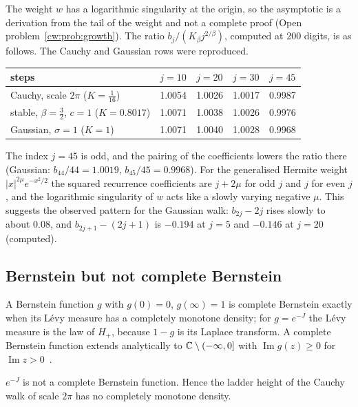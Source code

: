 The weight $w$ has a logarithmic singularity at the origin, so the asymptotic is a derivation from the tail of the weight and not a complete proof (Open problem~\ref{cw:prob:growth}). The ratio $b_j/(K_\beta j^{2/\beta})$, computed at 200 digits, is as follows. The Cauchy and Gaussian rows were reproduced.
\begin{center}
\small
\begin{tabular}{lllll}
\toprule
steps & $j=10$ & $j=20$ & $j=30$ & $j=45$\\
\midrule
Cauchy, scale $2\pi$ ($K=\frac1{16}$) & 1.0054 & 1.0026 & 1.0017 & 0.9987\\
stable, $\beta=\frac32$, $c=1$ ($K=0.8017$) & 1.0071 & 1.0038 & 1.0026 & 0.9976\\
Gaussian, $\sigma=1$ ($K=1$) & 1.0071 & 1.0040 & 1.0028 & 0.9968\\
\bottomrule
\end{tabular}
\end{center}
The index $j=45$ is odd, and the pairing of the coefficients lowers the ratio there (Gaussian: $b_{44}/44=1.0019$, $b_{45}/45=0.9968$). For the generalised Hermite weight $|x|^{2\mu}e^{-x^2/2}$ the squared recurrence coefficients are $j+2\mu$ for odd $j$ and $j$ for even $j$, and the logarithmic singularity of $w$ acts like a slowly varying negative $\mu$. This suggests the observed pattern for the Gaussian walk: $b_{2j}-2j$ rises slowly to about $0.08$, and $b_{2j+1}-(2j+1)$ is $-0.194$ at $j=5$ and $-0.146$ at $j=20$ (computed).

\subsection{Bernstein but not complete Bernstein}
A Bernstein function $g$ with $g(0)=0$, $g(\infty)=1$ is complete Bernstein exactly when its L\'evy measure has a completely monotone density; for $g=e^{-J}$ the L\'evy measure is the law of $H_+$, because $1-g$ is its Laplace transform. A complete Bernstein function extends analytically to $\mathbb{C}\setminus(-\infty,0]$ with $\operatorname{Im}g(z)\ge0$ for $\operatorname{Im}z>0$~\cite{boSSV}.

\begin{proposition}[proved]\label{cw:prop:notcbf}
$e^{-J}$ is not a complete Bernstein function. Hence the ladder height of the Cauchy walk of scale $2\pi$ has no completely monotone density.
\end{proposition}

